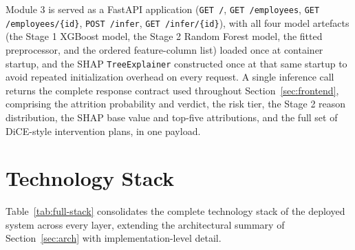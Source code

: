 \documentclass[11pt,a4paper]{article}
\newcommand{\code}[1]{\texttt{\footnotesize #1}}
\begin{document}
Module 3 is served as a FastAPI application (\code{GET /}, \code{GET /employees}, \code{GET /employees/\{id\}}, \code{POST /infer}, \code{GET /infer/\{id\}}), with all four model artefacts (the Stage 1 XGBoost model, the Stage 2 Random Forest model, the fitted preprocessor, and the ordered feature-column list) loaded once at container startup, and the SHAP \code{TreeExplainer} constructed once at that same startup to avoid repeated initialization overhead on every request. A single inference call returns the complete response contract used throughout Section~\ref{sec:frontend}, comprising the attrition probability and verdict, the risk tier, the Stage 2 reason distribution, the SHAP base value and top-five attributions, and the full set of DiCE-style intervention plans, in one payload.

\clearpage
\section{Technology Stack}
\label{sec:techstack}

Table~\ref{tab:full-stack} consolidates the complete technology stack of the deployed system across every layer, extending the architectural summary of Section~\ref{sec:arch} with implementation-level detail.
\end{document}
